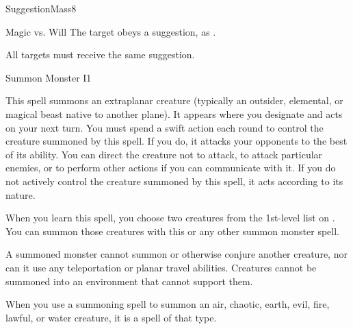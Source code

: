 \begin{spellsection}{Suggestion}{Mass}{8}
\begin{spellheader}
    \begin{spelltargetinginfo}
    \end{spelltargetinginfo}
\end{spellheader}
\begin{spellcontent}
    \begin{spelleffects}
        \begin{spellattack}{Magic vs. Will}
            \spelleffect The target obeys a suggestion, as .
        \end{spellattack}
        \spelldur \durmed
    \end{spelleffects}
\end{spellcontent}
\begin{spellfooter}
    \spellnotes All targets must receive the same suggestion.
\end{spellfooter}
\end{spellsection}

\begin{spellsection}{Summon Monster I}{1}\hypertarget{spell:summon monster}{}
\begin{spellheader}
\end{spellheader}
\begin{spellcontent}
    \spelleffect This spell summons an extraplanar creature (typically an outsider, elemental, or magical beast native to another plane). It appears where you designate and acts on your next turn. You must spend a swift action each round to control the creature summoned by this spell. If you do, it attacks your opponents to the best of its ability. You can direct the creature not to attack, to attack particular enemies, or to perform other actions if you can communicate with it. If you do not actively control the creature summoned by this spell, it acts according to its nature.
    \par When you learn this spell, you choose two creatures from the 1st-level list on . You can summon those creatures with this or any other summon monster spell.
    \par A summoned monster cannot summon or otherwise conjure another creature, nor can it use any teleportation or planar travel abilities. Creatures cannot be summoned into an environment that cannot support them.
    \par When you use a summoning spell to summon an air, chaotic, earth, evil, fire, lawful, or water creature, it is a spell of that type.
    \spelldur \durshort \dismissable
\end{spellcontent}
\begin{spellfooter}
\end{spellfooter}
\end{spellsection}

